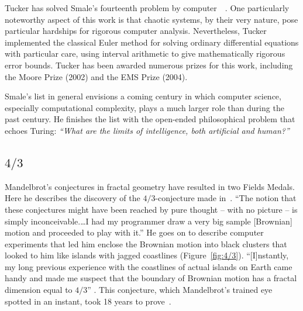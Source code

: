 \documentclass{llncs}
\begin{document}
Tucker has solved Smale's fourteenth problem by
computer~\cite{Tuc02}~\cite{St00}.  One particularly noteworthy aspect
of this work is that chaotic systems, by their very nature, pose
particular hardships for rigorous computer analysis.  Nevertheless,
Tucker implemented the classical Euler method for solving ordinary
differential equations with particular care,  using interval
arithmetic to give mathematically rigorous error bounds.  Tucker has
been awarded numerous prizes for this work, including the Moore Prize
(2002) and the EMS Prize (2004).

Smale's list in general envisions a coming century in which computer
science, especially computational complexity, plays a much larger
role than during the past century. He finishes the list with the
open-ended philosophical problem  that echoes Turing: {\it
  ``What are the limits of intelligence, both artificial and human?''}


\subsection{$4/3$}
Mandelbrot's conjectures in fractal geometry have resulted in two
Fields Medals.  Here he describes the discovery of the
$4/3$-conjecture made in~\cite{ManFN}.  ``The notion that these
conjectures might have been reached by pure thought -- with no picture
-- is simply inconceivable.\dots I had my programmer draw a very big
sample [Brownian] motion and proceeded to play with it.''  He goes on
to describe computer experiments that led him enclose the Brownian
motion into black clusters that looked to him like islands with jagged
coastlines (Figure~\ref{fig:4/3}).
%
``[I]nstantly, my long previous experience with the coastlines of
  actual islands on Earth came handy and made me suspect that the
  boundary of Brownian motion has a fractal dimension equal to $4/3$''
\cite{Man}.
%
%
This conjecture, which  Mandelbrot's trained eye spotted in an instant,
took 18 years to prove~\cite{LSW01}.
\end{document}
